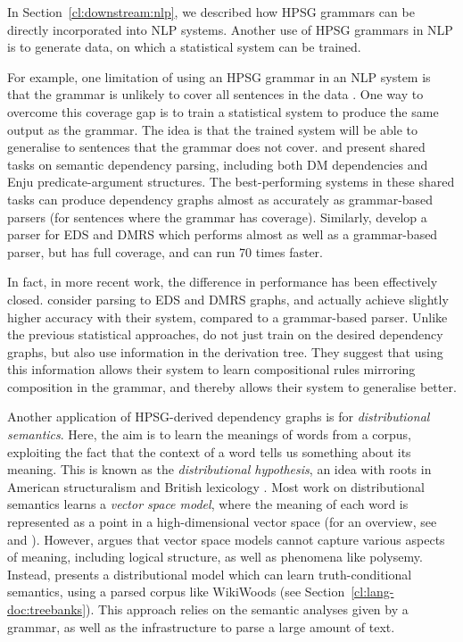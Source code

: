 \documentclass[output=paper,nonflat]{langsci/langscibook}
\begin{document}
In Section~\ref{cl:downstream:nlp},
we described how HPSG grammars can be directly incorporated into NLP systems.
Another use of HPSG grammars in NLP
is to generate data, on which a statistical system can be trained.

For example, one limitation of using an HPSG grammar in an NLP system
is that the grammar is unlikely to cover all sentences in the data \citep{flickinger2012deepbank}.
One way to overcome this coverage gap
is to train a statistical system to produce the same output as the grammar.
The idea is that the trained system will be able to generalise to sentences that the grammar does not cover.
\citet{oepen2014semeval} and \citet{oepen2015semeval}
present shared tasks on semantic dependency parsing,
including both DM dependencies and Enju predicate-argument structures.
The best-performing systems in these shared tasks
can produce dependency graphs almost as accurately as grammar-based parsers
(for sentences where the grammar has coverage).
Similarly, \citet{buys2017parse} develop a parser for EDS and DMRS
which performs almost as well as a grammar-based parser,
but has full coverage, and can run 70 times faster.

In fact, in more recent work, the difference in performance has been effectively closed.
\citet{chen2018parse} consider parsing to EDS and DMRS graphs,
and actually achieve slightly higher accuracy with their system,
compared to a grammar-based parser.
Unlike the previous statistical approaches,
\citeauthor{chen2018parse} do not just train on the desired dependency graphs,
but also use information in the derivation tree.
They suggest that using this information allows their system
to learn compositional rules mirroring composition in the grammar,
and thereby allows their system to generalise better.

Another application of HPSG-derived dependency graphs
is for \textit{distributional semantics}.
Here, the aim is to learn the meanings of words from a corpus,
exploiting the fact that the context of a word tells us something about its meaning.
This is known as the \textit{distributional hypothesis},
an idea with roots in American structuralism \citep{harris1954distribution}
and British lexicology \citep{firth1951collocation,firth1957company}.
Most work on distributional semantics learns a \textit{vector space model},
where the meaning of each word is represented as a point in a high-dimensional vector space
(for an overview, see \citealt{erk2012vector} and \citealt{clark2015vector}).
However, \citet{emerson2018functional} argues that
vector space models cannot capture various aspects of meaning,
including logical structure, as well as phenomena like polysemy.
Instead, \citeauthor{emerson2018functional} presents a distributional model
which can learn truth-conditional semantics,
using a parsed corpus like WikiWoods (see Section~\ref{cl:lang-doc:treebanks}).
This approach relies on the semantic analyses given by a grammar,
as well as the infrastructure to parse a large amount of text.
\end{document}
